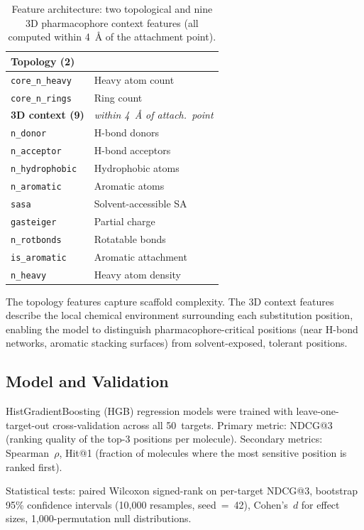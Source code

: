 \documentclass[sigconf, nonacm]{acmart}
\newcommand{\feat}[1]{\texttt{#1}}
\begin{document}
\begin{table}[ht]
\caption{Feature architecture: two topological and nine 3D pharmacophore context features (all computed within 4~\AA{} of the attachment point).}
\label{tab:features}
\small
\begin{tabular}{@{}p{1.3in}l@{}}
\toprule
\textbf{Topology (2)} \\
\midrule
\feat{core\_n\_heavy}   & Heavy atom count \\
\feat{core\_n\_rings}    & Ring count \\
\addlinespace
\textbf{3D context (9)} & \textit{within 4~\AA{} of attach.\ point} \\
\midrule
\feat{n\_donor}       & H-bond donors \\
\feat{n\_acceptor}    & H-bond acceptors \\
\feat{n\_hydrophobic} & Hydrophobic atoms \\
\feat{n\_aromatic}    & Aromatic atoms \\
\feat{sasa}           & Solvent-accessible SA \\
\feat{gasteiger}      & Partial charge \\
\feat{n\_rotbonds}    & Rotatable bonds \\
\feat{is\_aromatic}   & Aromatic attachment \\
\feat{n\_heavy}       & Heavy atom density \\
\bottomrule
\end{tabular}
\end{table}

The topology features capture scaffold complexity. The 3D context features describe the local chemical environment surrounding each substitution position, enabling the model to distinguish pharmacophore-critical positions (near H-bond networks, aromatic stacking surfaces) from solvent-exposed, tolerant positions.

\subsection{Model and Validation}

HistGradientBoosting (HGB) regression models were trained with leave-one-target-out cross-validation across all 50~targets. Primary metric: NDCG@3 (ranking quality of the top-3 positions per molecule). Secondary metrics: Spearman~$\rho$, Hit@1 (fraction of molecules where the most sensitive position is ranked first).

Statistical tests: paired Wilcoxon signed-rank on per-target NDCG@3, bootstrap 95\% confidence intervals (10{,}000 resamples, seed~=~42), Cohen's~$d$ for effect sizes, 1{,}000-permutation null distributions.
\end{document}
